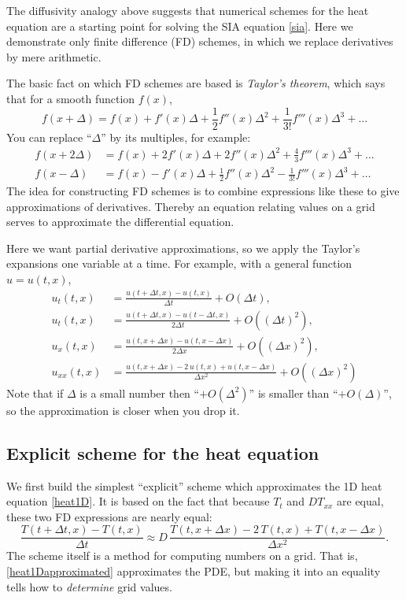 \documentclass[letterpaper,final,12pt,reqno]{amsart}
\begin{document}
The diffusivity analogy above suggests that numerical schemes for the heat equation are a starting point for solving the SIA equation \eqref{sia}.  Here we demonstrate only finite difference (FD) schemes, in which we replace derivatives by mere arithmetic.

The basic fact on which FD schemes are based is \emph{Taylor's theorem}, which says that for a smooth function $f(x)$,
	$$f(x+\Delta) = f(x) + f'(x) \Delta + \frac{1}{2} f''(x) \Delta^2 + \frac{1}{3!} f'''(x) \Delta^3 + \dots$$
You can replace ``$\Delta$'' by its multiples, for example:
\begin{align*}
f(x+2\Delta) &= f(x) + 2 f'(x) \Delta + 2 f''(x) \Delta^2 + \frac{4}{3} f'''(x) \Delta^3 + \dots \\
f(x-\Delta) &= f(x) - f'(x) \Delta + \frac{1}{2} f''(x) \Delta^2 - \frac{1}{3!} f'''(x) \Delta^3 + \dots
\end{align*}
The idea for constructing FD schemes is to combine expressions like these to give approximations of derivatives.  Thereby an equation relating values on a grid serves to approximate the differential equation.

Here we want partial derivative approximations, so we apply the Taylor's expansions one variable at a time.  For example, with a general function $u=u(t,x)$,
\begin{align*}
u_t(t,x) &= \frac{u(t+\Delta t,x) - u(t,x)}{\Delta t} + O(\Delta t), \\
u_t(t,x) &= \frac{u(t+\Delta t,x) - u(t-\Delta t,x)}{2\Delta t} + O((\Delta t)^2), \\
u_x(t,x) &= \frac{u(t,x+\Delta x) - u(t,x-\Delta x)}{2\Delta x} + O((\Delta x)^2), \\
u_{xx}(t,x) &= \frac{u(t,x+\Delta x) - 2\, u(t,x) + u(t,x-\Delta x)}{\Delta x^2} + O((\Delta x)^2)
\end{align*}
Note that if $\Delta$ is a small number then ``$+O(\Delta^2)$'' is smaller than ``$+O(\Delta)$'', so the approximation is closer when you drop it.

\subsection*{Explicit scheme for the heat equation}  We first build the simplest ``explicit'' scheme which approximates the 1D heat equation \eqref{heat1D}.  It is based on the fact that because $T_t$ and $D T_{xx}$ are equal, these two FD expressions are nearly equal:
\begin{equation}
\frac{T(t+\Delta t,x) - T(t,x)}{\Delta t} \approx D\,\frac{T(t,x+\Delta x) - 2\, T(t,x) + T(t,x-\Delta x)}{\Delta x^2}.  \label{heat1Dapproximated}
\end{equation}
The scheme itself is a method for computing numbers on a grid.  That is, \eqref{heat1Dapproximated} approximates the PDE, but making it into an equality tells how to \emph{determine} grid values.
\end{document}
